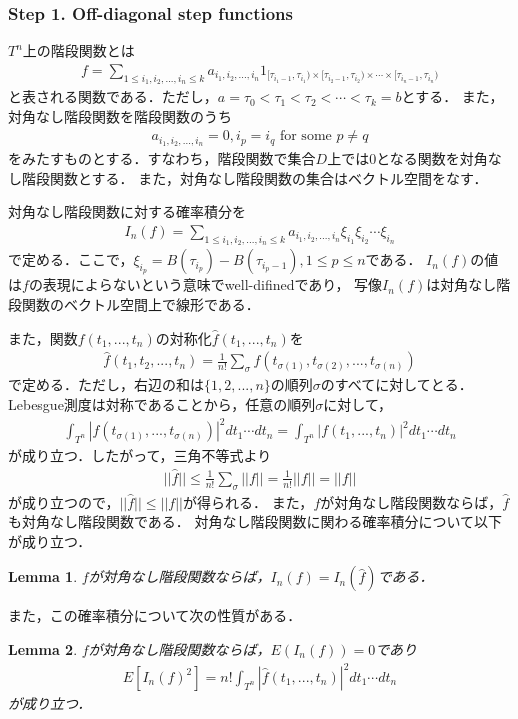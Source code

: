 \documentclass[a4paper,10pt]{jsarticle}
\theoremstyle{plain}
\newtheorem{lemma}{Lemma}
\newcommand{\eq}[1]{\begin{align}#1\end{align}}
\begin{document}
\subsubsection*{Step 1. Off-diagonal step functions}
$T^n$上の階段関数とは
\eq{f=\sum_{1\le i_1,i_2,...,i_n\le k}a_{i_1,i_2,...,i_n}1_{[\tau_{i_1-1},\tau_{i_1})\times[\tau_{i_2-1},\tau_{i_2})\times\cdots\times[\tau_{i_n-1},\tau_{i_n})}}
と表される関数である．ただし，$a=\tau_0<\tau_1<\tau_2<\cdots<\tau_k=b$とする．
また，対角なし階段関数を階段関数のうち
\eq{a_{i_1,i_2,...,i_n}=0,i_p=i_q\text{ for some }p\neq q}
をみたすものとする．すなわち，階段関数で集合$D$上では$0$となる関数を対角なし階段関数とする．
また，対角なし階段関数の集合はベクトル空間をなす．

対角なし階段関数に対する確率積分を
\eq{I_n(f)=\sum_{1\le i_1,i_2,...,i_n\le k}a_{i_1,i_2,...,i_n}\xi_{i_1}\xi_{i_2}\cdots\xi_{i_n}}
で定める．ここで，$\xi_{i_p}=B(\tau_{i_p})-B(\tau_{i_p-1}),1\le p\le n$である．
$I_n(f)$の値は$f$の表現によらないという意味でwell-difinedであり，
写像$I_n(f)$は対角なし階段関数のベクトル空間上で線形である．

また，関数$f(t_1,...,t_n)$の対称化$\hat{f}(t_1,...,t_n)$を
\eq{\hat{f}(t_1,t_2,...,t_n)=\frac{1}{n!}\sum_\sigma f(t_{\sigma(1)},t_{\sigma(2)},...,t_{\sigma(n)})}
で定める．ただし，右辺の和は$\{1,2,...,n\}$の順列$\sigma$のすべてに対してとる．
Lebesgue測度は対称であることから，任意の順列$\sigma$に対して，
\eq{\int_{T^n}|f(t_{\sigma(1)},...,t_{\sigma(n)})|^2dt_1\cdots dt_n=\int_{T^n}|f(t_1,...,t_n)|^2dt_1\cdots dt_n}
が成り立つ．したがって，三角不等式より
\eq{||\hat{f}||\le\frac{1}{n!}\sum_\sigma||f||=\frac{1}{n!}||f||=||f||}
が成り立つので，$||\hat{f}||\le||f||$が得られる．
また，$f$が対角なし階段関数ならば，$\hat{f}$も対角なし階段関数である．
対角なし階段関数に関わる確率積分について以下が成り立つ．

\begin{lemma}\label{lem9.6.2}
$f$が対角なし階段関数ならば，$I_n(f)=I_n(\hat{f})$である．
\end{lemma}
また，この確率積分について次の性質がある．
\begin{lemma}\label{lem9.6.3}
$f$が対角なし階段関数ならば，$E\left(I_n(f)\right)=0$であり
\eq{E\left[I_n(f)^2\right]=n!\int_{T^n}|\hat{f}(t_1,...,t_n)|^2dt_1\cdots dt_n}
が成り立つ．
\end{lemma}

\end{document}
